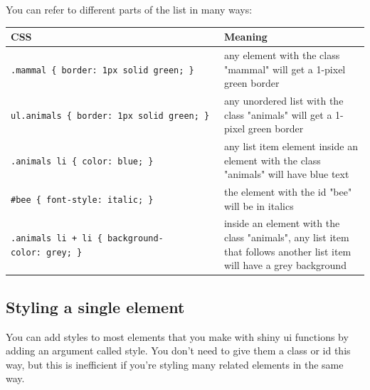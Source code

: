 \documentclass[
  oneside]{book}
\newenvironment{Shaded}{\begin{snugshade}}{\end{snugshade}}
\newcommand{\AttributeTok}[1]{\textcolor[rgb]{0.77,0.63,0.00}{#1}}
\newcommand{\FunctionTok}[1]{\textcolor[rgb]{0.00,0.00,0.00}{#1}}
\newcommand{\NormalTok}[1]{#1}
\newcommand{\SpecialCharTok}[1]{\textcolor[rgb]{0.00,0.00,0.00}{#1}}
\newcommand{\StringTok}[1]{\textcolor[rgb]{0.31,0.60,0.02}{#1}}
\begin{document}
You can refer to different parts of the list in many ways:

\begin{longtable}[]{@{}
  >{\raggedright\arraybackslash}p{}
  >{\raggedright\arraybackslash}p{}@{}}
\toprule
CSS & Meaning \\
\midrule
\endhead
\texttt{.mammal\ \{\ border:\ 1px\ solid\ green;\ \}} & any element with the \AttributeTok{class} \StringTok{"mammal"} will get a 1-pixel green border \\
\texttt{ul.animals\ \{\ border:\ 1px\ solid\ green;\ \}} & any unordered list with the \AttributeTok{class} \StringTok{"animals"} will get a 1-pixel green border \\
\texttt{.animals\ li\ \{\ color:\ blue;\ \}} & any list item element inside an element with the \AttributeTok{class} \StringTok{"animals"} will have blue text \\
\texttt{\#bee\ \{\ font-style:\ italic;\ \}} & the element with the \AttributeTok{id} \StringTok{"bee"} will be in italics \\
\texttt{.animals\ li\ +\ li\ \{\ background-color:\ grey;\ \}} & inside an element with the \AttributeTok{class} \StringTok{"animals"}, any list item that follows another list item will have a grey background \\
\bottomrule
\end{longtable}

\hypertarget{styling-a-single-element}{%
\subsection{Styling a single element}\label{styling-a-single-element}}

You can add styles to most elements that you make with shiny ui functions by adding an argument called \AttributeTok{style}. You don't need to give them a \NormalTok{class} or \NormalTok{id} this way, but this is inefficient if you're styling many related elements in the same way.

\begin{Shaded}
\end{Shaded}
\end{document}
